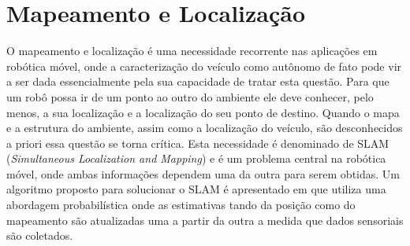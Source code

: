 \section{Mapeamento e Localização}
\label{sec:mapeamento_localizacao}


O mapeamento e localização é uma necessidade recorrente nas aplicações em
robótica móvel, onde a caracterização do veículo como autônomo de fato pode vir
a ser dada essencialmente pela sua capacidade de tratar esta questão. Para que
um robô possa ir de um ponto ao outro do ambiente ele deve conhecer, pelo menos,
a sua localização e a localização do seu ponto de destino. Quando o mapa e a
estrutura do ambiente, assim como a localização do veículo, são desconhecidos a
priori essa questão se torna crítica. Esta necessidade é denominado de SLAM
(\textit{Simultaneous Localization and Mapping}) e é um problema central na
robótica móvel, onde ambas informações dependem uma da outra para serem obtidas. Um
algoritmo proposto para solucionar o SLAM é apresentado em \cite{Thrun2004} que
utiliza uma abordagem probabilística onde as estimativas tando da posição como
do mapeamento são atualizadas uma a partir da outra a medida que dados
sensoriais são coletados.


